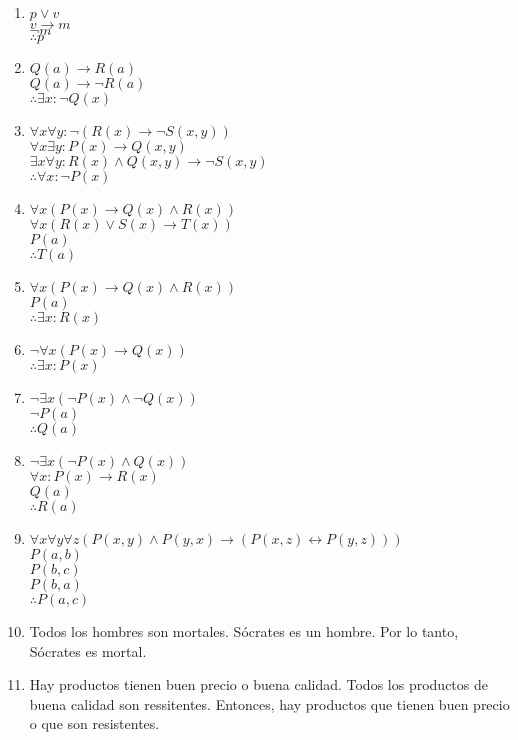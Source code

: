 \documentclass[a4paper]{article}
\newcommand{\then}{\to}
\newcommand{\eq}{\leftrightarrow}
\begin{document}
\begin{enumerate}
\begin{enumerate} [label=(\alph*)]
		\item $p \lor v$ \\ $v \then m$ \\ $\neg m$ \\ $\therefore p$ 
		\item $Q(a) \then R(a)$ \\ $Q(a) \then \neg R(a)$ \\ $\therefore \exists x: \neg Q(x)$ 
		\item $\forall x \forall y: \neg (R(x) \then \neg S(x,y))$ \\ $\forall x \exists y: P(x) \then Q(x,y)$ \\ $\exists x \forall y: R(x) \land Q(x,y) \then \neg S(x,y) $ \\ $\therefore \forall x: \neg P(x)$ 
		\item $\forall x ( P(x) \then  Q(x) \land  R(x) )$ \\
			$\forall x ( R(x) \lor  S(x) \then  T(x) )$ \\
			$P(a)$ \\
			$\therefore T(a)$
		\item $\forall x ( P(x)\then  Q(x) \land  R(x) )$ \\
			$P(a)$ \\
			$\therefore \exists x: R(x)$
		\item $\neg \forall x ( P(x) \then  Q(x) )$ \\
			$\therefore \exists x: P(x)$
		\item $\neg \exists x ( \neg P(x) \land  \neg Q(x) )$ \\
			$\neg P(a)$ \\
			$\therefore Q(a)$
		\item $\neg \exists x ( \neg P(x) \land  Q(x) )$ \\
			$\forall x:  P(x) \then  R(x)$ \\
			$Q(a)$ \\
			$\therefore R(a)$
		\item $\forall x\forall y\forall z ( P(x,y)\land P(y,x) \then  (P(x,z)\eq P(y,z)) )$ \\
			$P(a,b)$ \\
			$P(b,c)$ \\
			$P(b,a)$ \\
			$\therefore P(a,c)$
		\item Todos los hombres son mortales. Sócrates es un hombre. Por lo tanto, Sócrates es mortal.
		\item Hay productos tienen buen precio o buena calidad. Todos los productos de buena calidad son ressitentes. Entonces, hay productos que tienen buen precio o que son resistentes. 

\end{enumerate}
\end{enumerate}
\end{document}
